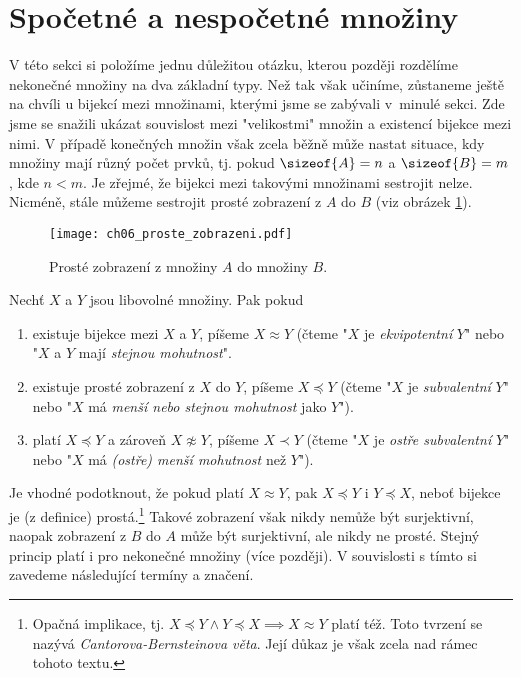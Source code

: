 \section{Spočetné a nespočetné množiny}\label{sec:spocetne_a_nespocetne_mnoziny}
V této sekci si položíme jednu důležitou otázku, kterou později rozdělíme nekonečné množiny na dva základní typy. Než tak však učiníme, zůstaneme ještě na chvíli u bijekcí mezi množinami, kterými jsme se zabývali v~minulé sekci. Zde jsme se snažili ukázat souvislost mezi "velikostmi" množin a existencí bijekce mezi nimi. V případě konečných množin však zcela běžně může nastat situace, kdy množiny mají různý počet prvků, tj. pokud $\sizeof{A}=n$ a $\sizeof{B}=m$, kde $n<m$. Je zřejmé, že bijekci mezi takovými množinami sestrojit nelze. Nicméně, stále můžeme sestrojit prosté zobrazení z $A$ do $B$ (viz obrázek \ref{fig:proste_zobrazeni_A_do_B}).
\begin{figure}[H]
    \centering
    \texttt{[image: ch06\_proste\_zobrazeni.pdf]}
    \caption{Prosté zobrazení z množiny $A$ do množiny $B$.}
    \label{fig:proste_zobrazeni_A_do_B}
\end{figure}
\begin{definition}\label{def:subvalence_a_ekvipotence}
    Nechť $X$ a $Y$ jsou libovolné množiny. Pak pokud
    \begin{enumerate}[label=(\roman*)]
        \item existuje bijekce mezi $X$ a $Y$, píšeme $X\approx Y$ (čteme "$X$ je \emph{ekvipotentní} $Y$" nebo "$X$ a $Y$ mají \emph{stejnou mohutnost}".
        \item existuje prosté zobrazení z $X$ do $Y$, píšeme $X\preccurlyeq Y$ (čteme "$X$ je \emph{subvalentní} $Y$" nebo "$X$ má \emph{menší nebo stejnou mohutnost} jako $Y$").
        \item platí $X\preccurlyeq Y$ a zároveň $X\napprox Y$, píšeme $X\prec Y$ (čteme "$X$ je \emph{ostře subvalentní} $Y$" nebo "$X$ má \emph{(ostře) menší mohutnost} než $Y$").
    \end{enumerate}
\end{definition}
Je vhodné podotknout, že pokud platí $X\approx Y$, pak $X\preccurlyeq Y$ i $Y\preccurlyeq X$, neboť bijekce je (z definice) prostá.\footnote{Opačná implikace, tj. $X\preccurlyeq Y \land Y\preccurlyeq X\implies X\approx Y$ platí též. Toto tvrzení se nazývá \emph{Cantorova-Bernsteinova věta}. Její důkaz je však zcela nad rámec tohoto textu.}
Takové zobrazení však nikdy nemůže být surjektivní, naopak zobrazení z $B$ do $A$ může být surjektivní, ale nikdy ne prosté. Stejný princip platí i pro nekonečné množiny (více později). V souvislosti s tímto si zavedeme následující termíny a značení.\par
